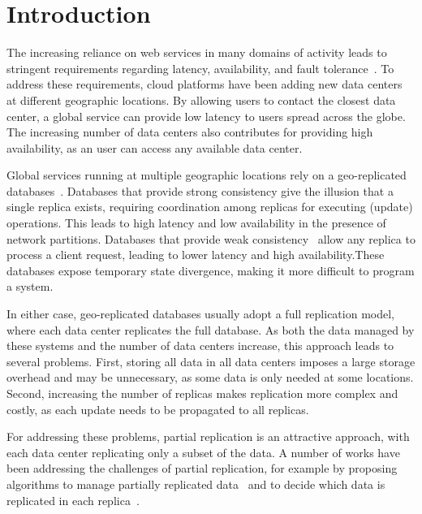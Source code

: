\documentclass[sigplan,twocolumn,review,anonymous]{acmart}
\begin{document}
\section{Introduction}
\label{sec:introduction}


The increasing reliance on web services in many domains of activity leads to stringent requirements regarding latency, availability,
and fault tolerance~\cite{Schurman2009latency,gomez}.
To address these requirements, cloud platforms have been adding new data centers at different geographic 
locations. By allowing users to contact the closest data center, a global service can
provide low latency to users spread across the globe. 
The increasing number of data centers also contributes
for providing high availability,  as an user can access any
available data center.


Global services running at multiple geographic locations rely on a geo-replicated databases~\cite{dynamo, hildred2023caerus, nguyen2023detock}.
Databases that provide strong consistency \cite{spanner,cockroachdb,mdcc} give the illusion that 
a single replica exists, requiring coordination among
replicas for executing (update) operations. This leads to high latency and low 
availability in the presence of network partitions.
Databases that provide weak consistency~\cite{eventual,dynamo,cops} allow any replica to process a
client request, leading to lower latency and high availability.These databases expose
temporary state divergence, making it more difficult to program a system. 

In either case, geo-replicated databases usually adopt a full replication model, where each data 
center replicates the full database. 
As both the data managed by these systems and the number of data centers increase,
this approach leads to several problems.
First, storing all data in all data centers imposes a large storage overhead and may be unnecessary, 
as some data is only needed at some locations.
Second, increasing the number of replicas makes replication 
more complex and costly, 
as each update needs to be propagated to all replicas.

For addressing these problems, partial replication is an attractive approach, with each data center
replicating only a subset of the data.
A number of works have been addressing the challenges of 
partial replication, for example by proposing algorithms to manage partially 
replicated data~\cite{spanner,sipre, practi, hildred2023caerus} and to decide which data is replicated in each replica~\cite{slog, sipre}.
\end{document}
